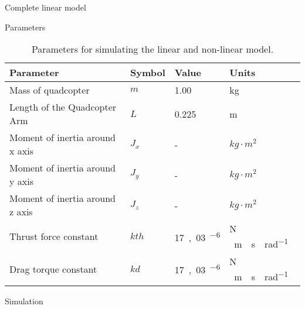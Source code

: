 Complete linear model

Parameters
\begin{table}[H]
	\centering
	\begin{tabular}{|l|l|l|p{3cm}|}
		\hline %
		\textbf{Parameter} &\textbf{Symbol}&\textbf{Value} &\textbf{Units}\\
		\hline %
		Mass of quadcopter& $m$         & 1.00       &kg\\
		\hline
		Length of the Quadcopter Arm & $L$        & 0.225       &m\\
		\hline 
		Moment of inertia around x axis & $J_x$         &  - 	& $kg \cdot m^2$\\
		\hline
		Moment of inertia around y axis & $J_y$         & - 	& $kg \cdot m^2$\\
		\hline 
		Moment of inertia around z axis & $J_z$         & -	    &$kg \cdot m^2$\\
		\hline  
		Thrust force constant  & $k{th}$        & \si{17,03 \cdot 10^{-6}}       &N \si{\cdot m \cdot s \cdot rad^{-1}}\\
		\hline
		Drag torque constant  & $k{d}$        & \si{17,03 \cdot 10^{-6}}       &N \si{\cdot m \cdot s \cdot rad^{-1}}\\
		\hline
	\end{tabular}
	\caption{Parameters for simulating the linear and non-linear model.}
	\label{ParametersModel}
\end{table}\vspace{-18pt}

Simulation\\
